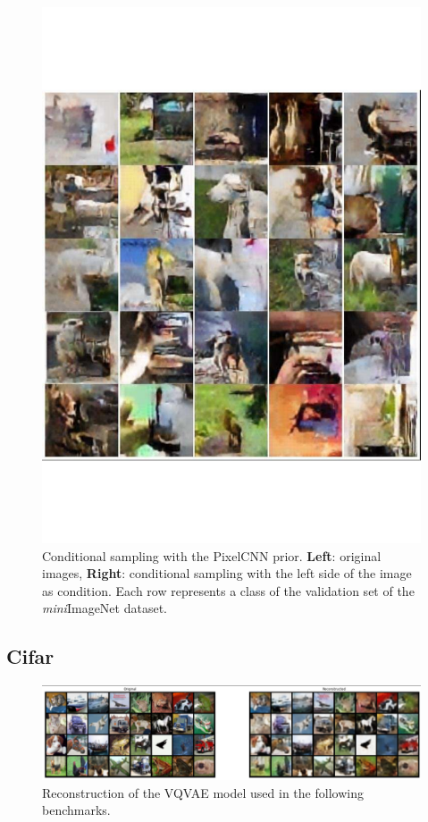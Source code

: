 \documentclass{article}
\theoremstyle{plain}
\theoremstyle{definition}
\theoremstyle{remark}
\begin{document}
\begin{figure}
\begin{minipage}[b]{0.45\textwidth}
    \includegraphics[width=1.\linewidth]{./cond_sampling_pixelcnn.pdf}
        \end{minipage}
    \caption{Conditional sampling with the PixelCNN prior. \textbf{Left}: original images, \textbf{Right}: conditional sampling with the left side of the image as condition. Each row represents a class of the validation set of the \textit{mini}ImageNet dataset.}
    \label{fig:miniimagenet_prior_pixelcnn_conditional}

\end{figure}

\clearpage

\subsection{Cifar}

\begin{figure}[!htb]
    \centering
    \includegraphics[width=\linewidth]{./cifar_vqvae.pdf}
    \caption{Reconstruction of the VQVAE model used in the following benchmarks.}
    \label{fig:cifar_vqvae}
\end{figure}
\end{document}
